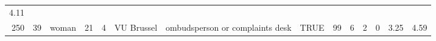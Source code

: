 \documentclass[]{svmono}
\theoremstyle{definition}
\theoremstyle{definition}
\theoremstyle{definition}
\theoremstyle{remark}
\begin{document}
\begin{longtable}[]{@{}rrlrrlllrrrrrr@{}}
\begin{minipage}[t]{0.03\columnwidth}
4.11\strut
\end{minipage}\tabularnewline
\begin{minipage}[t]{0.02\columnwidth}\raggedleft\strut
250\strut
\end{minipage} & \begin{minipage}[t]{0.03\columnwidth}\raggedleft\strut
39\strut
\end{minipage} & \begin{minipage}[t]{0.03\columnwidth}\raggedright\strut
woman\strut
\end{minipage} & \begin{minipage}[t]{0.02\columnwidth}\raggedleft\strut
21\strut
\end{minipage} & \begin{minipage}[t]{0.03\columnwidth}\raggedleft\strut
4\strut
\end{minipage} & \begin{minipage}[t]{0.09\columnwidth}\raggedright\strut
VU Brussel\strut
\end{minipage} & \begin{minipage}[t]{0.14\columnwidth}\raggedright\strut
ombudsperson or complaints desk\strut
\end{minipage} & \begin{minipage}[t]{0.04\columnwidth}\raggedright\strut
TRUE\strut
\end{minipage} & \begin{minipage}[t]{0.02\columnwidth}\raggedleft\strut
99\strut
\end{minipage} & \begin{minipage}[t]{0.03\columnwidth}\raggedleft\strut
6\strut
\end{minipage} & \begin{minipage}[t]{0.05\columnwidth}\raggedleft\strut
2\strut
\end{minipage} & \begin{minipage}[t]{0.06\columnwidth}\raggedleft\strut
0\strut
\end{minipage} & \begin{minipage}[t]{0.04\columnwidth}\raggedleft\strut
3.25\strut
\end{minipage} & \begin{minipage}[t]{0.03\columnwidth}\raggedleft\strut
4.59\strut
\end{minipage}\tabularnewline
\bottomrule
\end{longtable}
\end{document}
